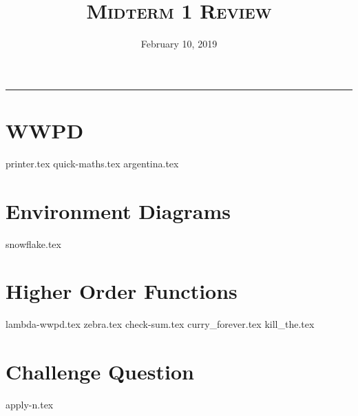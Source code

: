 \documentclass{exam}
\title{\textsc{Midterm 1 Review}}
\date{February 10, 2019}
\begin{document}
\maketitle
\rule{\textwidth}{0.15em}
\fontsize{12}{15}\selectfont


\section{WWPD}
\begin{questions}
{printer.tex}
{quick-maths.tex}
{argentina.tex}
\end{questions}

\newpage
\section{Environment Diagrams}
\begin{questions}
{snowflake.tex}
\end{questions}

\newpage
\section{Higher Order Functions}
\begin{questions}
{lambda-wwpd.tex}
{zebra.tex}
\newpage
{check-sum.tex}
{curry_forever.tex}
{kill_the.tex}
\end{questions}


\section{Challenge Question}
\begin{questions}
{apply-n.tex}
\end{questions}
\end{document}

